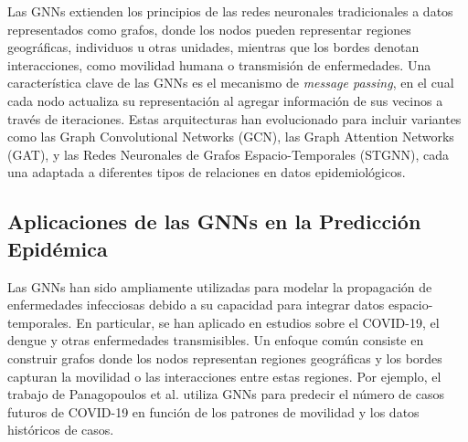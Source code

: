 
Las GNNs extienden los principios de las redes neuronales tradicionales a datos representados como grafos, donde los nodos pueden representar regiones geográficas, individuos u otras unidades, mientras que los bordes denotan interacciones, como movilidad humana o transmisión de enfermedades. Una característica clave de las GNNs es el mecanismo de \textit{message passing}, en el cual cada nodo actualiza su representación al agregar información de sus vecinos a través de iteraciones. Estas arquitecturas han evolucionado para incluir variantes como las Graph Convolutional Networks (GCN), las Graph Attention Networks (GAT), y las Redes Neuronales de Grafos Espacio-Temporales (STGNN), cada una adaptada a diferentes tipos de relaciones en datos epidemiológicos.

\subsection{Aplicaciones de las GNNs en la Predicción Epidémica}

Las GNNs han sido ampliamente utilizadas para modelar la propagación de enfermedades infecciosas debido a su capacidad para integrar datos espacio-temporales. En particular, se han aplicado en estudios sobre el COVID-19, el dengue y otras enfermedades transmisibles. Un enfoque común consiste en construir grafos donde los nodos representan regiones geográficas y los bordes capturan la movilidad o las interacciones entre estas regiones. Por ejemplo, el trabajo de Panagopoulos et al.\parencite{Panagopoulos_Nikolentzos_Vazirgiannis_2021} utiliza GNNs para predecir el número de casos futuros de COVID-19 en función de los patrones de movilidad y los datos históricos de casos.

